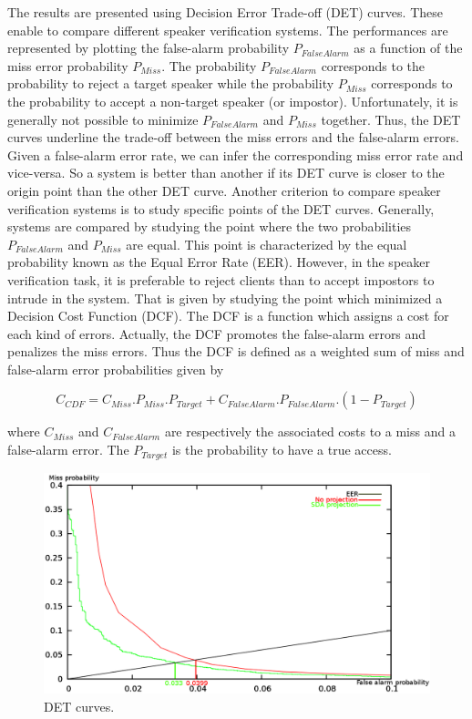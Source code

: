 \documentclass{techrep}
\begin{document}
The results are presented using Decision Error Trade-off (DET)
curves. These enable to compare different speaker verification
systems. The performances are represented by plotting the false-alarm
probability $P_{FalseAlarm}$ as a function of the miss error
probability $P_{Miss}$. The probability $P_{FalseAlarm}$ corresponds
to the probability to reject a target speaker while the probability
$P_{Miss}$ corresponds to the probability to accept a non-target
speaker (or impostor). Unfortunately, it is generally not possible to
minimize $P_{FalseAlarm}$ and $P_{Miss}$ together. Thus, the DET
curves underline the trade-off between the miss errors and the
false-alarm errors. Given a false-alarm error rate, we can infer the
corresponding miss error rate and vice-versa. So a system is better
than another if its DET curve is closer to the origin point than the
other DET curve.  Another criterion to compare speaker verification
systems is to study specific points of the DET curves. Generally,
systems are compared by studying the point where the two probabilities
$P_{FalseAlarm}$ and $P_{Miss}$ are equal. This point is characterized
by the equal probability known as the Equal Error Rate (EER). However,
in the speaker verification task, it is preferable to reject
clients than to accept impostors to intrude in the system. That is
given by studying the point which minimized a Decision Cost Function
(DCF). The DCF is a function which assigns a cost for each kind of
errors. Actually, the DCF promotes the false-alarm errors and
penalizes the miss errors. Thus the DCF is defined as a weighted sum
of miss and false-alarm error probabilities given by

$$C_{CDF} = C_{Miss}.P_{Miss}.P_{Target} + C_{FalseAlarm}.P_{FalseAlarm}.(1 - P_{Target})$$

where $C_{Miss}$ and $C_{FalseAlarm}$ are respectively the associated
costs to a miss and a false-alarm error. The $P_{Target}$ is the
probability to have a true access.

\begin{figure}[H]
  \centering
  \includegraphics[width=450px]{det_curves}
  \caption{DET curves.}
  \label{detcurve}
\end{figure}
\end{document}
